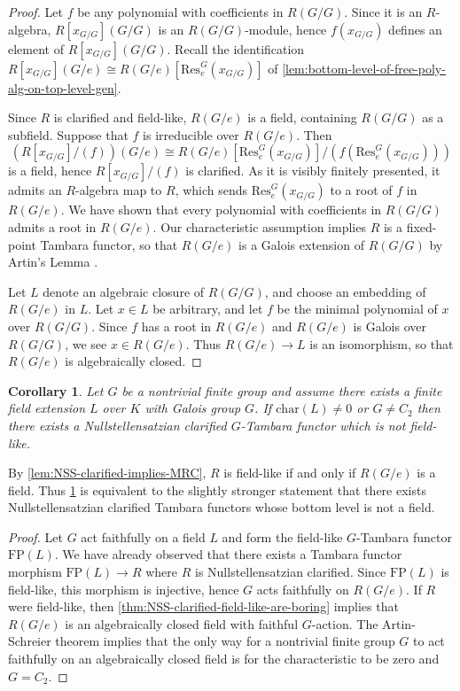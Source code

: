 \documentclass[11pt,dvipsnames]{amsart}
\newtheorem{corollary}[theorem]{Corollary}
\theoremstyle{BoldRemark}
\begin{document}
\begin{proof}
	Let $f$ be any polynomial with coefficients in $R(G/G)$. Since it is an $R$-algebra, $R[x_{G/G}](G/G)$ is an $R(G/G)$-module, hence $f(x_{G/G})$ defines an element of $R[x_{G/G}](G/G)$. Recall the identification $R[x_{G/G}](G/e) \cong R(G/e)[\mathrm{Res}_e^G(x_{G/G})]$ of \cref{lem:bottom-level-of-free-poly-alg-on-top-level-gen}.
	
	Since $R$ is clarified and field-like, $R(G/e)$ is a field, containing $R(G/G)$ as a subfield. Suppose that $f$ is irreducible over $R(G/e)$. Then \[ \left( R[x_{G/G}]/(f) \right)(G/e) \cong R(G/e)[\mathrm{Res}_e^G(x_{G/G})]/(f(\mathrm{Res}_e^G(x_{G/G}))) \] is a field, hence $R[x_{G/G}]/(f)$ is clarified. As it is visibly finitely presented, it admits an $R$-algebra map to $R$, which sends $\mathrm{Res}_e^G(x_{G/G})$ to a root of $f$ in $R(G/e)$. We have shown that every polynomial with coefficients in $R(G/G)$ admits a root in $R(G/e)$. Our characteristic assumption implies $R$ is a fixed-point Tambara functor, so that $R(G/e)$ is a Galois extension of $R(G/G)$ by Artin's Lemma \cite{Art42}.
	
	Let $L$ denote an algebraic closure of $R(G/G)$, and choose an embedding of $R(G/e)$ in $L$. Let $x \in L$ be arbitrary, and let $f$ be the minimal polynomial of $x$ over $R(G/G)$. Since $f$ has a root in $R(G/e)$ and $R(G/e)$ is Galois over $R(G/G)$, we see $x \in R(G/e)$. Thus $R(G/e) \rightarrow L$ is an isomorphism, so that $R(G/e)$ is algebraically closed.
\end{proof}

\begin{corollary}\label{cor:existence-of-non-field-like-NSS-clarifieds}
	Let $G$ be a nontrivial finite group and assume there exists a finite field extension $L$ over $K$ with Galois group $G$. If $\mathrm{char}(L) \neq 0$ or $G \neq C_2$ then there exists a Nullstellensatzian clarified $G$-Tambara functor which is not field-like.
\end{corollary}

By \cref{lem:NSS-clarified-implies-MRC}, $R$ is field-like if and only if $R(G/e)$ is a field. Thus \cref{cor:existence-of-non-field-like-NSS-clarifieds} is equivalent to the slightly stronger statement that there exists Nullstellensatzian clarified Tambara functors whose bottom level is not a field.

\begin{proof}
	Let $G$ act faithfully on a field $L$ and form the field-like $G$-Tambara functor $\mathrm{FP}(L)$. We have already observed that there exists a Tambara functor morphism $\mathrm{FP}(L) \rightarrow R$ where $R$ is Nullstellensatzian clarified. Since $\mathrm{FP}(L)$ is field-like, this morphism is injective, hence $G$ acts faithfully on $R(G/e)$. If $R$ were field-like, then \cref{thm:NSS-clarified-field-like-are-boring} implies that $R(G/e)$ is an algebraically closed field with faithful $G$-action. The Artin-Schreier theorem \cite{AS27a} \cite{AS27b} implies that the only way for a nontrivial finite group $G$ to act faithfully on an algebraically closed field is for the characteristic to be zero and $G = C_2$.
\end{proof}
\end{document}
